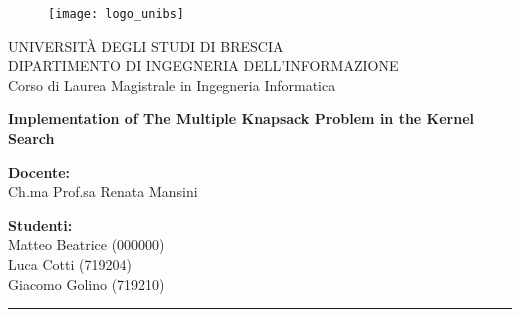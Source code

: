 \begin{titlepage}
    \begin{figure}[H] %
        \centering
        \texttt{[image: logo\_unibs]}
    \end{figure}

    \begin{center}
        \LARGE{\uppercase{Università degli Studi di Brescia}}\\ %
        \vspace{5mm} %
        \large{\uppercase{Dipartimento di Ingegneria dell'informazione}}\\
        \vspace{5mm}
        \large{Corso di Laurea Magistrale in Ingegneria Informatica}\\
    \end{center}

    \vspace{10mm}

    \begin{center}
        \LARGE{\textbf{Implementation of The Multiple Knapsack Problem in the Kernel Search}}\\
    \end{center}

    \vspace{10mm}

    \begin{flushleft}
        \large
        \textbf{Docente:}\\
        Ch.ma Prof.sa Renata Mansini
    \end{flushleft}

    \begin{flushright}
        \large
        \textbf{Studenti:}\\
        Matteo Beatrice (000000)\\
        Luca Cotti (719204)\\
        Giacomo Golino (719210)
    \end{flushright}

    \vspace*{\fill} %

    \rule{0.8\textwidth}{0.6pt}\\ %
\end{titlepage}